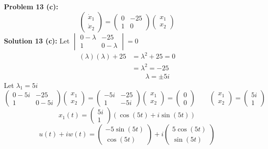 \documentclass[12pt]{article}
\begin{document}
\noindent \textbf{Problem 13 (c): } 
$$
\begin{pmatrix}
\dot{x}_1 \\
\dot{x}_2
\end{pmatrix} = 
\begin{pmatrix}
0 & -25 \\
1 & 0
\end{pmatrix}
\begin{pmatrix}
x_1 \\
x_2
\end{pmatrix}
$$
\noindent \textbf{Solution 13 (c): } Let 
$
\begin{vmatrix}
0 - \lambda & -25 \\
1 & 0 - \lambda
\end{vmatrix} = 0
$
\begin{align*}
(\lambda)(\lambda) + 25 &=  \lambda^2 + 25 = 0 \\
&= \lambda^2 = -25 \\
& \qquad \lambda = \pm 5i
\end{align*}
Let $\lambda_1 = 5i$
$$\begin{pmatrix}
0 - 5i  & -25 \\
1 & 0 - 5i
\end{pmatrix}
\begin{pmatrix}
x_1 \\
x_2
\end{pmatrix} = 
\begin{pmatrix}
-5i & -25 \\
1 & -5i
\end{pmatrix}
\begin{pmatrix}
x_1 \\
x_2
\end{pmatrix} = 
\begin{pmatrix}
0 \\
0
\end{pmatrix} \qquad 
\begin{pmatrix}
x_1 \\
x_2
\end{pmatrix} = 
\begin{pmatrix}
5i \\
1
\end{pmatrix}$$
$$
x_1(t) = 
\begin{pmatrix}
	5i \\
	1
\end{pmatrix}
\left( \cos(5t) + i\sin(5t) \right)
$$
$$
u(t) + iw(t) = 
\begin{pmatrix}
	-5\sin(5t) \\
	\cos(5t)
\end{pmatrix} + 
i \begin{pmatrix}
	5\cos(5t) \\
	\sin(5t)
\end{pmatrix}
$$
\end{document}

